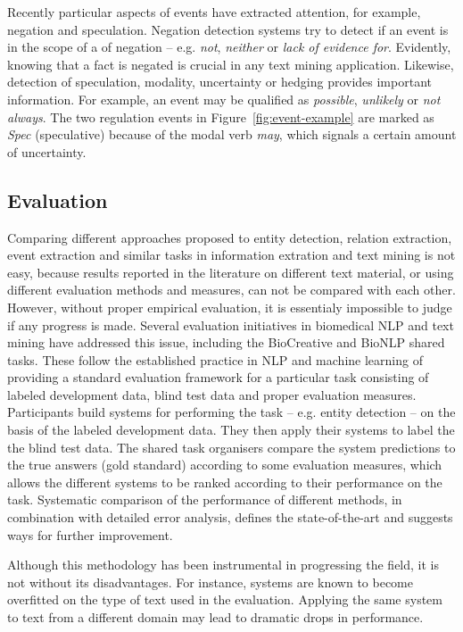 Recently particular aspects of events have extracted attention, for example, negation and speculation. Negation detection systems try to detect if an event is in the scope of a of negation -- e.g. \emph{not}, \emph{neither} or \emph{lack of evidence for}. 
Evidently, knowing that a fact is negated is crucial in any text mining application.
Likewise, detection of speculation, modality, uncertainty or hedging provides important information.
For example, an event may be qualified as \emph{possible}, \emph{unlikely} or \emph{not always}.
The two regulation events in Figure~\ref{fig:event-example} are marked as \emph{Spec} (speculative) because of the modal verb \emph{may}, which signals a certain amount of uncertainty.

\subsection{Evaluation}

Comparing different approaches proposed to entity detection, relation extraction, event extraction and similar tasks in information extration and text mining is not easy, because results reported in the literature on different text material, or using different evaluation methods and measures, can not be compared with each other.
However, without proper empirical evaluation, it is essentialy impossible to judge if any progress is made.
Several evaluation initiatives in biomedical NLP and text mining have addressed this issue, including the BioCreative and BioNLP shared tasks.
These follow the established practice in NLP and machine learning of providing a standard evaluation framework for a particular task consisting of labeled development data, blind test data and proper evaluation measures.   
Participants build systems for performing the task -- e.g. entity detection -- on the basis of the labeled development data.
They then apply their systems to label the the blind test data.
The shared task organisers compare the system predictions to the true answers (gold standard) according to some evaluation measures, which allows the different systems to be ranked according to their performance on the task.
Systematic comparison of the performance of different methods, in combination with detailed error analysis, defines the state-of-the-art and suggests ways for further improvement.

Although this methodology has been instrumental in progressing the field, it is not without its disadvantages.
For instance, systems are known to become overfitted on the type of text used in the evaluation.
Applying the same system to text from a different domain may lead to dramatic drops in performance. 

